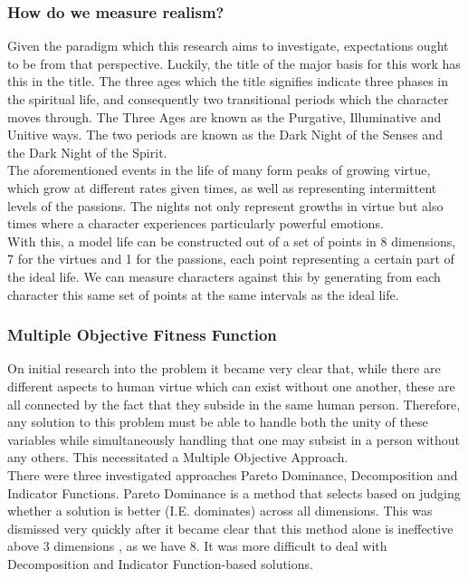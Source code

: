 \documentclass[11pt]{article}
\begin{document}
\subsubsection{How do we measure realism?}
Given the paradigm which this research aims to investigate, expectations ought to be from that perspective. Luckily, the title of the major basis for this work has this in the title. The three ages which the title signifies indicate three phases in the spiritual life, and consequently two transitional periods which the character moves through. The Three Ages are known as the Purgative, Illuminative and Unitive ways. The two periods are known as the Dark Night of the Senses and the Dark Night of the Spirit. \\
The aforementioned events in the life of many form peaks of growing virtue, which grow at different rates given times, as well as representing intermittent levels of the passions. The nights not only represent growths in virtue but also times where a character experiences particularly powerful emotions.\\

With this, a model life can be constructed out of a set of points in 8 dimensions, 7 for the virtues and 1 for the passions, each point representing a certain part of the ideal life. We can measure characters against this by generating from each character this same set of points at the same intervals as the ideal life. \\

\subsubsection{Multiple Objective Fitness Function}
On initial research into the problem it became very clear that, while there are different aspects to human virtue which can exist without one another, these are all connected by the fact that they subside in the same human person. Therefore, any solution to this problem must be able to handle both the unity of these variables while simultaneously handling that one may subsist in a person without any others. This necessitated a Multiple Objective Approach. \\

There were three investigated approaches \: Pareto Dominance, Decomposition and Indicator Functions. Pareto Dominance is a method that selects based on judging whether a solution is better (I.E. dominates) across all dimensions. This was dismissed very quickly after it became clear that this method alone is ineffective above 3 dimensions \cite{AchievementScalarazingIndicatorBased}, as we have 8. It was more difficult to deal with Decomposition and Indicator Function-based solutions.\\
\end{document}
